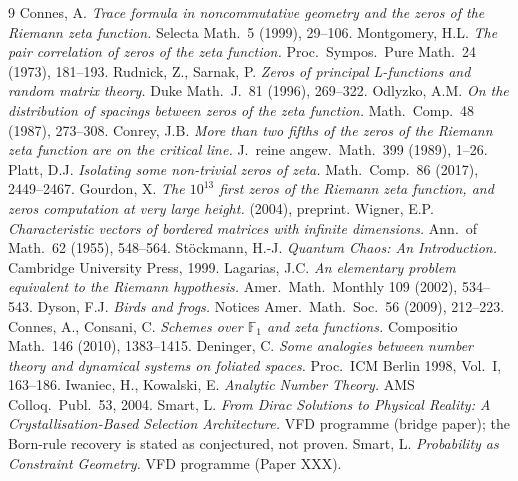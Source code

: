 \documentclass[11pt,a4paper]{article}
\theoremstyle{definition}
\newcommand{\F}{\mathbb{F}}
\begin{document}
\begin{thebibliography}{9}
 Connes, A. \emph{Trace formula in noncommutative geometry
and the zeros of the Riemann zeta function.} Selecta Math.\ 5 (1999), 29--106.
 Montgomery, H.L. \emph{The pair correlation of zeros of
the zeta function.} Proc.\ Sympos.\ Pure Math.\ 24 (1973), 181--193.
 Rudnick, Z., Sarnak, P. \emph{Zeros of principal
L-functions and random matrix theory.} Duke Math.\ J.\ 81 (1996), 269--322.
 Odlyzko, A.M. \emph{On the distribution of spacings between
zeros of the zeta function.} Math.\ Comp.\ 48 (1987), 273--308.
 Conrey, J.B. \emph{More than two fifths of the zeros of the
Riemann zeta function are on the critical line.} J.\ reine angew.\ Math.\ 399
(1989), 1--26.
 Platt, D.J. \emph{Isolating some non-trivial zeros of zeta.}
Math.\ Comp.\ 86 (2017), 2449--2467.
 Gourdon, X. \emph{The $10^{13}$ first zeros of the Riemann
zeta function, and zeros computation at very large height.} (2004), preprint.
 Wigner, E.P. \emph{Characteristic vectors of bordered
matrices with infinite dimensions.} Ann.\ of Math.\ 62 (1955), 548--564.
 St\"ockmann, H.-J. \emph{Quantum Chaos: An Introduction.}
Cambridge University Press, 1999.
 Lagarias, J.C. \emph{An elementary problem equivalent to
the Riemann hypothesis.} Amer.\ Math.\ Monthly 109 (2002), 534--543.
 Dyson, F.J. \emph{Birds and frogs.} Notices Amer.\ Math.\ Soc.\
56 (2009), 212--223.
 Connes, A., Consani, C. \emph{Schemes over $\F_1$ and
zeta functions.} Compositio Math.\ 146 (2010), 1383--1415.
 Deninger, C. \emph{Some analogies between number theory and
dynamical systems on foliated spaces.} Proc.\ ICM Berlin 1998, Vol.\ I, 163--186.
\bibitem{IK} Iwaniec, H., Kowalski, E. \emph{Analytic Number Theory.} AMS
Colloq.\ Publ.\ 53, 2004.
 Smart, L. \emph{From Dirac Solutions to Physical
Reality: A Crystallisation-Based Selection Architecture.} VFD programme
(bridge paper); the Born-rule recovery is stated as conjectured, not proven.
\bibitem{ProbGeom} Smart, L. \emph{Probability as Constraint Geometry.} VFD
programme (Paper XXX).
\end{thebibliography}
\end{document}
